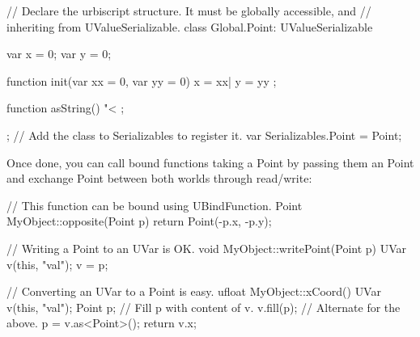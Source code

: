 \begin{urbiunchecked}
// Declare the urbiscript structure. It must be globally accessible, and
// inheriting from UValueSerializable.
class Global.Point: UValueSerializable
{
  var x = 0;
  var y = 0;

  function init(var xx = 0, var yy = 0)
  {
    x = xx|
    y = yy
  };

  function asString()
  {
    "<%
  };
};
// Add the class to Serializables to register it.
var Serializables.Point = Point;
\end{urbiunchecked}

Once done, you can call bound functions taking a \Cxx Point by passing them
an \us Point and exchange Point between both worlds through \UVar
read/write:

\begin{cxx}
// This function can be bound using UBindFunction.
Point MyObject::opposite(Point p)
{
  return Point(-p.x, -p.y);
}

// Writing a Point to an UVar is OK.
void MyObject::writePoint(Point p)
{
  UVar v(this, "val");
  v = p;
}

// Converting an UVar to a Point is easy.
ufloat MyObject::xCoord()
{
  UVar v(this, "val");
  Point p;
  // Fill p with content of v.
  v.fill(p);
  // Alternate for the above.
  p = v.as<Point>();
  return v.x;
}
\end{cxx}

